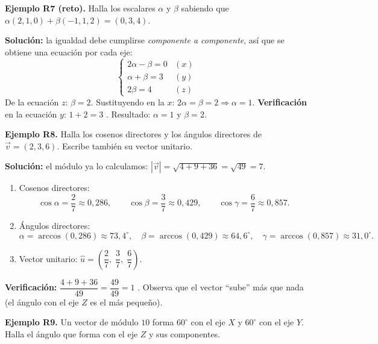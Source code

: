 \documentclass[12pt, letterpaper]{article}
\begin{document}
\textbf{Ejemplo R7 (reto).} Halla los escalares $\alpha$ y $\beta$ sabiendo que $\alpha(2, 1, 0) + \beta(-1, 1, 2) = (0, 3, 4)$.

\begin{cuadrosolucion}
  \textbf{Solución:} la igualdad debe cumplirse \emph{componente a componente}, así que se obtiene una ecuación por cada eje:
  $$\begin{cases} 2\alpha - \beta = 0 & (x) \\ \alpha + \beta = 3 & (y) \\ 2\beta = 4 & (z) \end{cases}$$
  De la ecuación $z$: $\beta = 2$. Sustituyendo en la $x$: $2\alpha = \beta = 2 \Rightarrow \alpha = 1$. \textbf{Verificación} en la ecuación $y$: $1 + 2 = 3$ \checkmark.
  Resultado: $\alpha = 1$ y $\beta = 2$.
\end{cuadrosolucion}

\textbf{Ejemplo R8.} Halla los cosenos directores y los ángulos directores de $\vec{v} = (2, 3, 6)$. Escribe también su vector unitario.

\begin{cuadrosolucion}
  \textbf{Solución:} el módulo ya lo calculamos: $|\vec{v}| = \sqrt{4 + 9 + 36} = \sqrt{49} = 7$.
  \begin{enumerate}[leftmargin=*, label=\arabic*.]
    \item Cosenos directores:
          $$\cos\alpha = \frac{2}{7} \approx 0{,}286, \qquad \cos\beta = \frac{3}{7} \approx 0{,}429, \qquad \cos\gamma = \frac{6}{7} \approx 0{,}857.$$
    \item Ángulos directores:
          $$\alpha = \arccos(0{,}286) \approx 73{,}4^{\circ}, \quad \beta = \arccos(0{,}429) \approx 64{,}6^{\circ}, \quad \gamma = \arccos(0{,}857) \approx 31{,}0^{\circ}.$$
    \item Vector unitario: $\hat{u} = \left(\dfrac{2}{7},\; \dfrac{3}{7},\; \dfrac{6}{7}\right)$.
  \end{enumerate}
  \textbf{Verificación:} $\dfrac{4 + 9 + 36}{49} = \dfrac{49}{49} = 1$ \checkmark. Observa que el vector ``sube'' más que nada (el ángulo con el eje $Z$ es el más pequeño).
\end{cuadrosolucion}

\textbf{Ejemplo R9.} Un vector de módulo $10$ forma $60^{\circ}$ con el eje $X$ y $60^{\circ}$ con el eje $Y$. Halla el ángulo que forma con el eje $Z$ y sus componentes.
\end{document}
